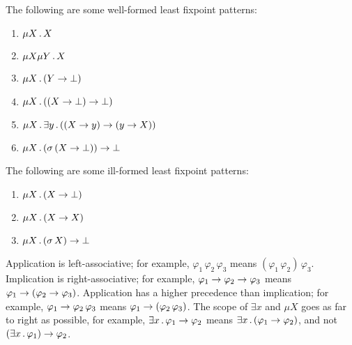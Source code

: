 \documentclass{article}
\begin{document}
The following are some well-formed least fixpoint patterns:
\begin{enumerate}
\item $\mu X \,.\, X$
\item $\mu X \mu Y \,.\, X$
\item $\mu X \,.\, (Y \to \bot)$
\item $\mu X \,.\, ((X \to \bot) \to \bot)$
\item $\mu X \,.\, \exists y \,.\, ((X \to y) \to (y \to X))$
\item $\mu X \,.\, (\sigma \, (X \to \bot)) \to \bot$
\end{enumerate}
The following are some ill-formed least fixpoint patterns:
\begin{enumerate}
\item $\mu X \,.\, (X \to \bot)$
\item $\mu X \,.\, (X \to X)$
\item $\mu X \,.\, (\sigma \, X) \to \bot$
\end{enumerate}

Application is left-associative;
for example, $\varphi_1 \, \varphi_2 \, \varphi_3$ means
$(\varphi_1 \, \varphi_2) \, \varphi_3$.
Implication is right-associative;
for example, $\varphi_1 \to \varphi_2 \to \varphi_3$ means
$\varphi_1 \to (\varphi_2 \to \varphi_3)$. 
Application has a higher precedence than implication;
for example, $\varphi_1 \to \varphi_2 \, \varphi_3$ means
$\varphi_1 \to (\varphi_2 \, \varphi_3)$. 
The scope of $\exists x$ and $\mu X$ goes as far to right as possible,
for example, $\exists x \,.\, \varphi_1 \to \varphi_2$ means
$\exists x \,.\, (\varphi_1 \to \varphi_2)$,
and not $(\exists x \,.\, \varphi_1) \to \varphi_2$.
\end{document}
